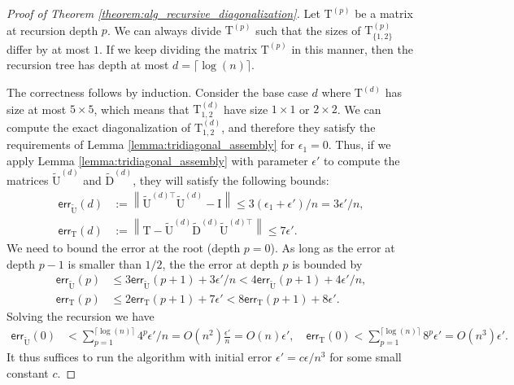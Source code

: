 \documentclass{article}
\newcommand{\lnorm}{\left\|}
\newcommand{\rnorm}{\right\|}
\newcommand\matI{\boldsymbol{\mathrm{I}}}
\newcommand\matT{\boldsymbol{\mathrm{T}}}
\newcommand\matDtilde{\widetilde{\boldsymbol{\mathrm{D}}}}
\newcommand\matUtilde{\widetilde{\boldsymbol{\mathrm{U}}}}
\begin{document}
\begin{proof}[Proof of Theorem \ref{theorem:alg_recursive_diagonalization}]
        Let $\matT^{(p)}$ be a matrix at recursion depth $p$. We can always divide $\matT^{(p)}$ such that the sizes of $\matT_{\{1,2\}}^{(p)}$ differ by at most $1$. If we keep dividing the matrix $\matT^{(p)}$ in this manner, then the recursion tree has depth at most $d=\lceil\log(n)\rceil$.
        
        The correctness follows by induction. Consider the base case $d$ where   $\matT^{(d)}$ has size at most $5\times 5$, which means that $\matT^{(d)}_{1,2}$ have size $1\times 1$ or $2\times 2$. We can compute the exact diagonalization of $\matT^{(d)}_{1,2}$, and therefore they satisfy the requirements of Lemma \ref{lemma:tridiagonal_assembly} for $\epsilon_1=0$. Thus, if we apply Lemma \ref{lemma:tridiagonal_assembly} with parameter $\epsilon'$ to compute the matrices $\matUtilde^{(d)}$ and $\matDtilde^{(d)}$,  they will satisfy the following bounds:
        \begin{align*}
        \mathsf{err}_{\matUtilde}(d)&:=
        \lnorm\matUtilde^{(d)\top}\matUtilde^{(d)}-\matI\rnorm\leq 3(\epsilon_1+\epsilon')/n=3\epsilon'/n,
        \\
        \mathsf{err}_{\matT}(d)&:=
        \lnorm 
            \matT-\matUtilde^{(d)}\matDtilde^{(d)}\matUtilde^{(d)\top}
        \rnorm \leq 7\epsilon'.
    \end{align*}
    We need to bound the error at the root (depth $p=0$). As long as  the error at depth $p-1$ is smaller than $1/2$, the the error at depth $p$ is bounded by
    \begin{align*}
        \mathsf{err}_{\matUtilde}(p) &\leq 3\mathsf{err}_{\matUtilde}(p+1)+3\epsilon'/n
        <
        4\mathsf{err}_{\matUtilde}(p+1)+4\epsilon'/n, 
        \\
        \mathsf{err}_{\matT}(p) &\leq 2\mathsf{err}_{\matT}(p+1)+7\epsilon'
        < 8\mathsf{err}_{\matT}(p+1)+8\epsilon'.
    \end{align*}
    Solving the recursion we have 
    \begin{align*}
        \mathsf{err}_{\matUtilde}(0) &< \sum_{p=1}^{\lceil\log(n)\rceil}4^p\epsilon'/n = O(n^2)\frac{\epsilon'}{n}=O(n)\epsilon',
        \quad
        \mathsf{err}_{\matT}(0) < \sum_{p=1}^{\lceil\log(n)\rceil}8^p\epsilon' = O(n^3)\epsilon'.
    \end{align*} 
    It thus suffices to run the algorithm with initial error $\epsilon'=c\epsilon/n^3$ for some small constant $c$.


\end{proof}
\end{document}
